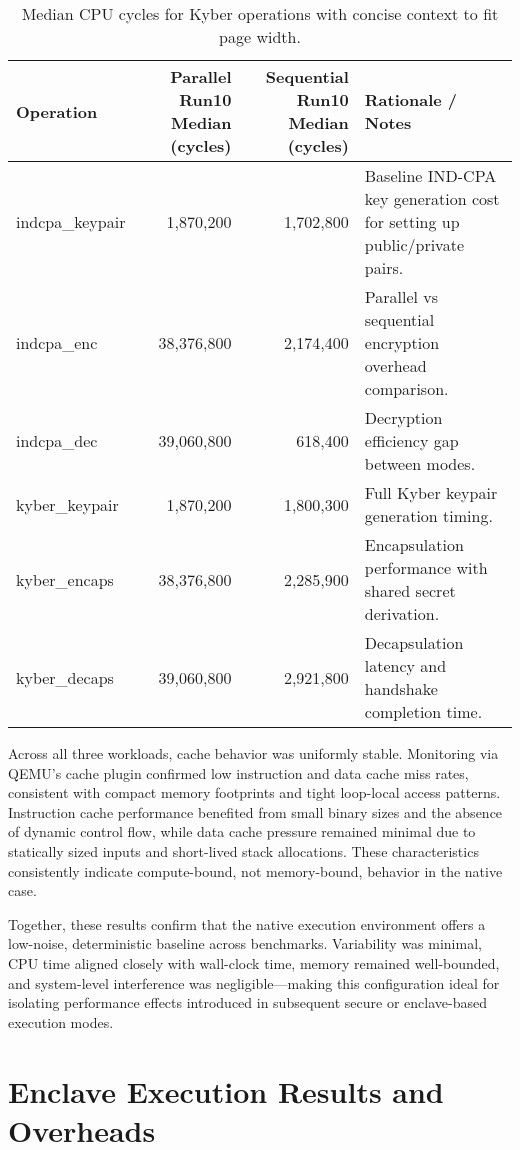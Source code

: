 \begin{table}[h]
\centering
\scriptsize
\begin{tabular}{|l|r|r|p{4.5cm}|}
\hline
\textbf{Operation} & \textbf{Parallel Run10 Median (cycles)} & \textbf{Sequential Run10 Median (cycles)} & \textbf{Rationale / Notes} \\
\hline
indcpa\_keypair & 1,870,200 & 1,702,800 & Baseline IND-CPA key generation cost for setting up public/private pairs. \\
\hline
indcpa\_enc     & 38,376,800 & 2,174,400 & Parallel vs sequential encryption overhead comparison. \\
\hline
indcpa\_dec     & 39,060,800 & 618,400   & Decryption efficiency gap between modes. \\
\hline
kyber\_keypair  & 1,870,200 & 1,800,300 & Full Kyber keypair generation timing. \\
\hline
kyber\_encaps   & 38,376,800 & 2,285,900 & Encapsulation performance with shared secret derivation. \\
\hline
kyber\_decaps   & 39,060,800 & 2,921,800 & Decapsulation latency and handshake completion time. \\
\hline
\end{tabular}
\caption{Median CPU cycles for Kyber operations with concise context to fit page width.}
\label{tab:kyber_median_cycles}
\end{table}


Across all three workloads, cache behavior was uniformly stable. Monitoring via QEMU’s cache plugin confirmed low instruction and data cache miss rates, consistent with compact memory footprints and tight loop-local access patterns. Instruction cache performance benefited from small binary sizes and the absence of dynamic control flow, while data cache pressure remained minimal due to statically sized inputs and short-lived stack allocations. These characteristics consistently indicate compute-bound, not memory-bound, behavior in the native case.

Together, these results confirm that the native execution environment offers a low-noise, deterministic baseline across benchmarks. Variability was minimal, CPU time aligned closely with wall-clock time, memory remained well-bounded, and system-level interference was negligible—making this configuration ideal for isolating performance effects introduced in subsequent secure or enclave-based execution modes.

\section{Enclave Execution Results and Overheads}
\label{sec:enclave-execution}

